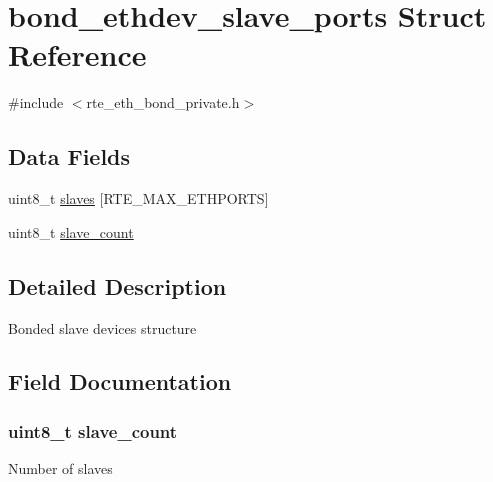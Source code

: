 \hypertarget{structbond__ethdev__slave__ports}{}\section{bond\+\_\+ethdev\+\_\+slave\+\_\+ports Struct Reference}
\label{structbond__ethdev__slave__ports}


{\ttfamily \#include $<$rte\+\_\+eth\+\_\+bond\+\_\+private.\+h$>$}

\subsection*{Data Fields}
\begin{DoxyCompactItemize}
\item 
uint8\+\_\+t \hyperlink{structbond__ethdev__slave__ports_aabe27a69cb59cc9e6a45c0f59a941cf9}{slaves} \mbox{[}R\+T\+E\+\_\+\+M\+A\+X\+\_\+\+E\+T\+H\+P\+O\+R\+T\+S\mbox{]}
\item 
uint8\+\_\+t \hyperlink{structbond__ethdev__slave__ports_ae245bc94feb81da053cc77f63abc07e2}{slave\+\_\+count}
\end{DoxyCompactItemize}


\subsection{Detailed Description}
Bonded slave devices structure 

\subsection{Field Documentation}
\hypertarget{structbond__ethdev__slave__ports_ae245bc94feb81da053cc77f63abc07e2}{}
\subsubsection[{slave\+\_\+count}]{\setlength{\rightskip}{0pt plus 5cm}uint8\+\_\+t slave\+\_\+count}\label{structbond__ethdev__slave__ports_ae245bc94feb81da053cc77f63abc07e2}
Number of slaves \hypertarget{structbond__ethdev__slave__ports_aabe27a69cb59cc9e6a45c0f59a941cf9}{}

